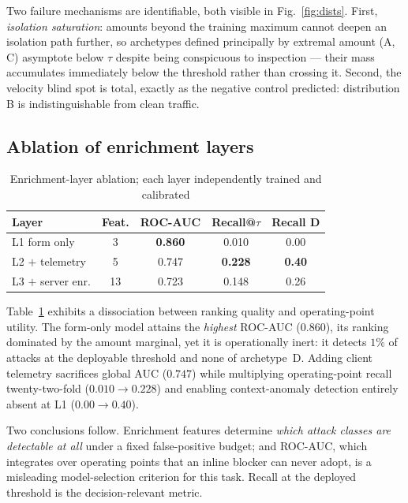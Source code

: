 \documentclass[journal]{IEEEtran}
\begin{document}
Two failure mechanisms are identifiable, both visible in
Fig.~\ref{fig:dists}. First, \emph{isolation saturation}: amounts beyond the
training maximum cannot deepen an isolation path further, so archetypes
defined principally by extremal amount (A, C) asymptote below $\tau$ despite
being conspicuous to inspection --- their mass accumulates immediately below
the threshold rather than crossing it. Second, the velocity blind spot is
total, exactly as the negative control predicted: distribution B is
indistinguishable from clean traffic.

\subsection{Ablation of enrichment layers}

\begin{table}[t]
\caption{Enrichment-layer ablation; each layer independently trained and
calibrated}
\label{tab:ablation}
\centering
\begin{tabular}{lcccc}
\toprule
\textbf{Layer} & \textbf{Feat.} & \textbf{ROC-AUC} &
\textbf{Recall@$\tau$} & \textbf{Recall D} \\
\midrule
L1 form only        & 3  & \textbf{0.860} & 0.010 & 0.00 \\
L2 $+$ telemetry    & 5  & 0.747 & \textbf{0.228} & \textbf{0.40} \\
L3 $+$ server enr.  & 13 & 0.723 & 0.148 & 0.26 \\
\bottomrule
\end{tabular}
\end{table}

Table~\ref{tab:ablation} exhibits a dissociation between ranking quality and
operating-point utility. The form-only model attains the \emph{highest}
ROC-AUC ($0.860$), its ranking dominated by the amount marginal, yet it is
operationally inert: it detects $1\%$ of attacks at the deployable threshold
and none of archetype~D. Adding client telemetry sacrifices global AUC
($0.747$) while multiplying operating-point recall twenty-two-fold
($0.010 \rightarrow 0.228$) and enabling context-anomaly detection entirely
absent at L1 ($0.00 \rightarrow 0.40$).

Two conclusions follow. Enrichment features determine \emph{which attack
classes are detectable at all} under a fixed false-positive budget; and
ROC-AUC, which integrates over operating points that an inline blocker can
never adopt, is a misleading model-selection criterion for this task.
Recall at the deployed threshold is the decision-relevant metric.
\end{document}
